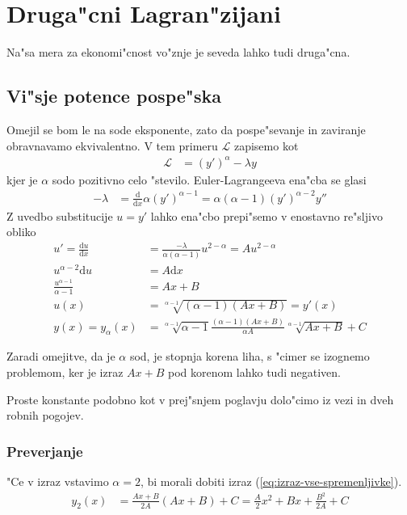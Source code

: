 \documentclass[12pt]{article}
\newcommand{\dd}{\mathrm{d}}
\begin{document}
\section{Druga"cni Lagran"zijani}

Na"sa mera za ekonomi"cnost vo"znje je seveda lahko tudi druga"cna. 

\subsection{Vi"sje potence pospe"ska}
Omejil se bom le na sode eksponente, zato da pospe"sevanje in zaviranje obravnavamo ekvivalentno. V tem primeru $\mathcal L$ zapisemo kot
\begin{align}
  \mathcal L &= (y')^\alpha - \lambda y
\end{align}
kjer je $\alpha$ sodo pozitivno celo "stevilo. Euler-Lagrangeeva ena"cba se glasi
\begin{align}
  -\lambda &= \frac{\dd}{\dd x}\alpha (y')^{\alpha-1} = \alpha (\alpha-1) (y')^{\alpha-2} y''
\end{align}
Z uvedbo substitucije $u=y'$ lahko ena"cbo prepi"semo v enostavno re"sljivo obliko
\begin{align}
  u' = \frac{\dd u}{\dd x}&= \frac{-\lambda}{\alpha(\alpha-1)}u^{2-\alpha} = Au^{2-\alpha}\\
  u^{\alpha-2}\dd u &= A\dd x \\
  \frac{u^{\alpha-1}}{\alpha-1} &= Ax + B \\
  u(x) &= \sqrt[\alpha-1]{(\alpha-1)(Ax+B)} = y'(x) \\
  y(x) = y_\alpha(x) &= \sqrt[\alpha-1]{\alpha-1} \frac{(\alpha-1)(Ax+B)}{\alpha A} \sqrt[\alpha-1]{Ax+B} + C \label{eq:izraz-poljuben-eksponent}
\end{align}

Zaradi omejitve, da je $\alpha$ sod, je stopnja korena liha, s "cimer se izognemo problemom, ker je izraz $Ax+B$ pod korenom lahko tudi negativen. 

Proste konstante podobno kot v prej"snjem poglavju dolo"cimo iz vezi in dveh robnih pogojev. 

\subsubsection{Preverjanje}

"Ce v izraz vstavimo $\alpha=2$, bi morali dobiti izraz (\ref{eq:izraz-vse-spremenljivke}). 
\begin{align}
  y_2(x) &= \frac{Ax+B}{2A}(Ax+B) + C = \frac{A}{2}x^2 + Bx + \frac{B^2}{2A} + C
\end{align}
\end{document}
